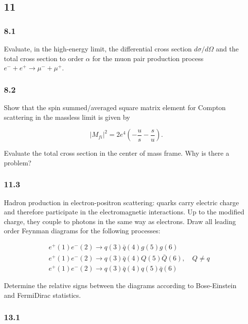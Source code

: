 \documentclass[10pt, letterpaper]{article}
\begin{document}
\pagebreak

\subsection{11}


\subsubsection{8.1} 

Evaluate, in the high-energy limit, the differential cross section $d \sigma / d \Omega$ and the total cross section to order $\alpha$ for the muon pair production process $e^{-}+e^{+} \longrightarrow \mu^{-}+\mu^{+}$.


\subsubsection{8.2} 


{\color{blue}
Show that the spin summed/averaged square matrix element for Compton scattering in the massless limit is given by

$$
\left|M_{f i}\right|^2=2 e^4\left(-\frac{u}{s}-\frac{s}{u}\right) .
$$


Evaluate the total cross section in the center of mass frame. Why is there a problem?
}

\subsubsection{11.3} 

Hadron production in electron-positron scattering: quarks carry electric charge and therefore participate in the electromagnetic interactions. Up to the modified charge, they couple to photons in the same way as electrons. Draw all leading order Feynman diagrams for the following processes:

$$
\begin{aligned}
& e^{+}(1) e^{-}(2) \longrightarrow q(3) \bar{q}(4) g(5) g(6) \\
& e^{+}(1) e^{-}(2) \longrightarrow q(3) \bar{q}(4) Q(5) \bar{Q}(6), \quad Q \neq q \\
& e^{+}(1) e^{-}(2) \longrightarrow q(3) \bar{q}(4) q(5) \bar{q}(6)
\end{aligned}
$$


Determine the relative signs between the diagrams according to Bose-Einstein and FermiDirac statistics.

\subsubsection{13.1 }
\end{document}
